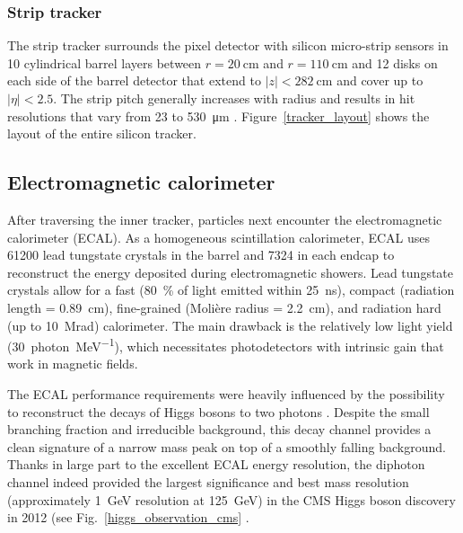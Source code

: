 


\subsubsection{Strip tracker}
The strip tracker surrounds the pixel detector with silicon micro-strip sensors in 10 cylindrical barrel layers between $r=\SI{20}{\cm}$ and $r=\SI{110}{\cm}$ and 12 disks on each side of the barrel detector that extend to $|z|<\SI{282}{\cm}$ and cover up to $|\eta|<2.5$. The strip pitch generally increases with radius and results in hit resolutions that vary from \num{23} to \SI{530}{\um} \cite{cms_experiment}. Figure~\ref{tracker_layout} shows the layout of the entire silicon tracker.



\subsection{Electromagnetic calorimeter}
After traversing the inner tracker, particles next encounter the electromagnetic calorimeter (ECAL). As a homogeneous scintillation calorimeter, ECAL uses \num{61200} lead tungstate crystals in the barrel and \num{7324} in each endcap to reconstruct the energy deposited during electromagnetic showers. Lead tungstate crystals allow for a fast (\SI{80}{\percent} of light emitted within \SI{25}{\ns}), compact (radiation length = \SI{0.89}{cm}), fine-grained (Moli\`ere radius = \SI{2.2}{\cm}), and radiation hard (up to \SI{10}{\mega rad}) calorimeter. The main drawback is the relatively low light yield (\SI{30}{photon\per\mega\electronvolt}), which necessitates photodetectors with intrinsic gain that work in magnetic fields\cite{cms_experiment, cms_tdr_v1}.

The ECAL performance requirements were heavily influenced by the possibility to reconstruct the decays of Higgs bosons to two photons \cite{cms_tdr_v2}. Despite the small branching fraction and irreducible background, this decay channel provides a clean signature of a narrow mass peak on top of a smoothly falling background. Thanks in large part to the excellent ECAL energy resolution, the diphoton channel indeed provided the largest significance and best mass resolution (approximately \SI{1}{\GeV} resolution at \SI{125}{\GeV}) in the CMS Higgs boson discovery in 2012 (see Fig.~\ref{higgs_observation_cms} \cite{cms_higgs}.

